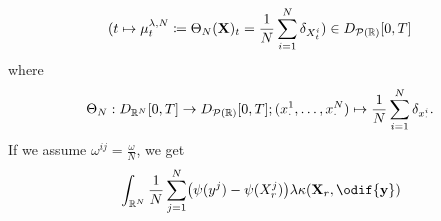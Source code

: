 \begin{equation}
  \lparen t \mapsto \mu_t^{\lambda, N} \coloneqq \Theta_N(\mathbf{X})_t = \frac{1}{N} \sum_{i=1}^N \delta_{X_t^i} \rparen \in D_{\mathcal{P}(\mathbb{R})}[0,T]
\end{equation}
where
\begin{equation}
  \Theta_N : D_{\mathbb{R}^N}[0,T] \to D_{\mathcal{P}(\mathbb{R})}[0,T]; (x_\cdot^1,\dots,x_\cdot^N) \mapsto \frac{1}{N} \sum_{i=1}^N \delta_{x_\cdot^i}.
\end{equation}
If we assume \(\omega^{ij} = \frac{\omega}{N}\), we get
\begin{equation}\label{eq:kappa-to-mean-kappa}
  \begin{split}
     & \int_{\potspace^N} \frac{1}{N} \sum_{j=1}^N \br*{ \psi(y^j) - \psi(X_{r}^j) } \lambda \kappa(\bm{X}_r, \odif{\bm{y}})                                                                  \\

\end{split}
\end{equation}
